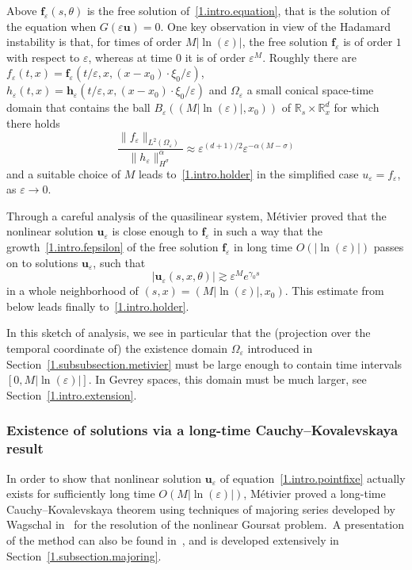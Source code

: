 \documentclass[10pt]{amsart}
\theoremstyle{definition}
\theoremstyle{plain}
\newcommand*\e{\varepsilon}
\newcommand*\R{{\mathbb R}}
\newcommand{\alf}{\alpha}%
\newcommand*\g{\gamma}
\newcommand{\ubf}{{\mathbf u}}
\newcommand*\f{{\mathbf f}}
\newcommand*\h{{\mathbf h}}
\begin{document}
Above $ \f_{\e}(s,\theta) $ is the free solution of~\eqref{1.intro.equation}, that is the solution of the equation when $G(\e \ubf) = 0$. One key observation in view of the Hadamard instability is that, for times of order $M|\ln(\e)|$, the free solution $ \f_{\e} $ is of order $1$ with respect to $\e$, whereas at time $0$ it is of order $\e^{M}$. Roughly there are $f_{\e}(t,x) = \f_{\e}(t/\e,x,(x-x_0)\cdot\xi_0/\e)$, $h_{\e}(t,x) = \h_{\e}(t/\e,x,(x-x_0)\cdot\xi_0/\e)$ and $\Omega_{\e}$ a small conical space-time domain that contains the ball $B_{\e}((M|\ln(\e)|,x_0))$ of $\R_s\times\R_x^{d}$ for which there holds
\begin{equation}\label{1.intro.ratio}
\frac{\|f_{\e}\|_{L^2(\Omega_{\e})}}{\|h_{\e}\|^{\alf}_{H^{\sigma}}} \approx \e^{(d+1)/2} \e^{-\alf(M-\sigma)}
\end{equation}
and a suitable choice of $M$ leads to~\eqref{1.intro.holder} in the simplified case $u_{\e} = f_{\e}$, as $\e\to0$.

Through a careful analysis of the quasilinear system, Métivier proved that the nonlinear solution $\ubf_{\e}$ is close enough to $\f_{\e}$ in such a way that the growth~\eqref{1.intro.fepsilon} of the free solution $\f_{\e}$ in long time $O(|\ln(\e)|)$ passes on to solutions $\ubf_{\e}$, such that
\begin{equation}\label{1.intro.growth}
|\ubf_{\e}(s,x,\theta)| \gtrsim \e^{M} e^{\g_0 s}
\end{equation}
in a whole neighborhood of $(s,x) = (M|\ln(\e)|,x_0)$. This estimate from below leads finally to~\eqref{1.intro.holder}.

In this sketch of analysis, we see in particular that the (projection over the temporal coordinate of) the existence domain $\Omega_{\e}$ introduced in Section~\ref{1.subsubsection.metivier} must be large enough to contain time intervals $[0,M|\ln(\e)|]$. In Gevrey spaces, this domain must be much larger, see Section~\ref{1.intro.extension}.


\subsubsection{Existence of solutions via a long-time Cauchy--Kovalevskaya result}\label{1.intro.ck}

In order to show that nonlinear solution $\ubf_{\e}$ of equation~\eqref{1.intro.pointfixe} actually exists for sufficiently long time $O(M|\ln(\e)|)$, Métivier proved a long-time Cauchy--Kovalevskaya theorem using techniques of majoring series developed by Wagschal in~\cite{wagschal1979probleme} for the resolution of the nonlinear Goursat problem.~A presentation of the method can also be found in~\cite{cartan1995theorie}, and is developed extensively in Section~\ref{1.subsection.majoring}.
\end{document}
